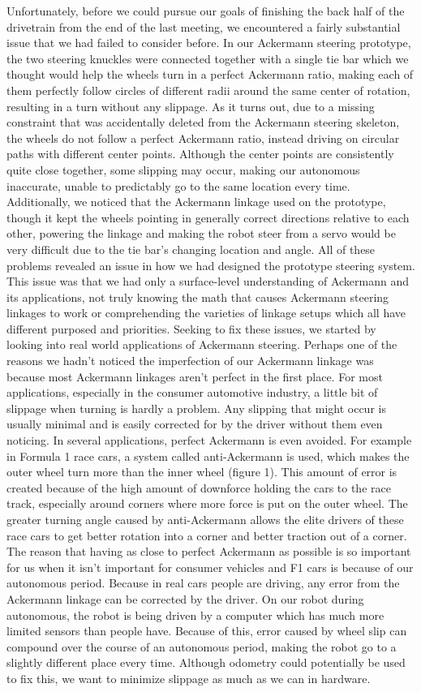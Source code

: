 Unfortunately, before we could pursue our goals of finishing the back half of the drivetrain from the end of the last meeting, we encountered a fairly substantial issue that we had failed to consider before. In our Ackermann steering prototype, the two steering knuckles were connected together with a single tie bar which we thought would help the wheels turn in a perfect Ackermann ratio, making each of them perfectly follow circles of different radii around the same center of rotation, resulting in a turn without any slippage. As it turns out, due to a missing constraint that was accidentally deleted from the Ackermann steering skeleton, the wheels do not follow a perfect Ackermann ratio, instead driving on circular paths with different center points. Although the center points are consistently quite close together, some slipping may occur, making our autonomous inaccurate, unable to predictably go to the same location every time. Additionally, we noticed that the Ackermann linkage used on the prototype, though it kept the wheels pointing in generally correct directions relative to each other, powering the linkage and making the robot steer from a servo would be very difficult due to the tie bar’s changing location and angle. All of these problems revealed an issue in how we had designed the prototype steering system. This issue was that we had only a surface-level understanding of Ackermann and its applications, not truly knowing the math that causes Ackermann steering linkages to work or comprehending the varieties of linkage setups which all have different purposed and priorities. 
Seeking to fix these issues, we started by looking into real world applications of Ackermann steering. Perhaps one of the reasons we hadn’t noticed the imperfection of our Ackermann linkage was because most Ackermann linkages aren’t perfect in the first place. For most applications, especially in the consumer automotive industry, a little bit of slippage when turning is hardly a problem. Any slipping that might occur is usually minimal and is easily corrected for by the driver without them even noticing. In several applications, perfect Ackermann is even avoided. For example in Formula 1 race cars, a system called anti-Ackermann is used, which makes the outer wheel turn more than the inner wheel (figure 1). This amount of error is created because of the high amount of downforce holding the cars to the race track, especially around corners where more force is put on the outer wheel. The greater turning angle caused by anti-Ackermann allows the elite drivers of these race cars to get better rotation into a corner and better traction out of a corner. The reason that having as close to perfect Ackermann as possible is so important for us when it isn’t important for consumer vehicles and F1 cars is because of our autonomous period. Because in real cars people are driving, any error from the Ackermann linkage can be corrected by the driver. On our robot during autonomous, the robot is being driven by a computer which has much more limited sensors than people have. Because of this, error caused by wheel slip can compound over the course of an autonomous period, making the robot go to a slightly different place every time. Although odometry could potentially be used to fix this, we want to minimize slippage as much as we can in hardware.
